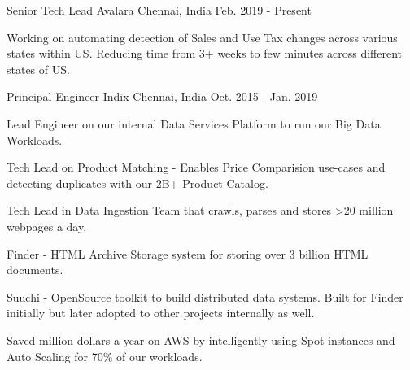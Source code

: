 

\begin{cventries}

  \cventry
    {Senior Tech Lead} %
    {Avalara} %
    {Chennai, India} %
    {Feb. 2019 - Present} %
    {
      \begin{cvitems} %
        \item {Working on automating detection of Sales and Use Tax changes across various states within US. Reducing time from 3+ weeks to few minutes across different states of US. }
      \end{cvitems}
    }

  \cventry
    {Principal Engineer} %
    {Indix} %
    {Chennai, India} %
    {Oct. 2015 - Jan. 2019} %
    {
      \begin{cvitems} %
        \item {Lead Engineer on our internal Data Services Platform to run our Big Data Workloads. }
        \item {Tech Lead on Product Matching - Enables Price Comparision use-cases and detecting duplicates with our 2B+ Product Catalog. }
        \item {Tech Lead in Data Ingestion Team that crawls, parses and stores >20 million webpages a day. }
        \item {Finder - HTML Archive Storage system for storing over 3 billion HTML documents.}
        \item {\href{https://github.com/ashwanthkumar/suuchi}{Suuchi} - OpenSource toolkit to build distributed data systems. Built for Finder initially but later adopted to other projects internally as well. }
        \item {Saved million dollars a year on AWS by intelligently using Spot instances and Auto Scaling for 70\% of our workloads. }
      \end{cvitems}
    }


\end{cventries}
